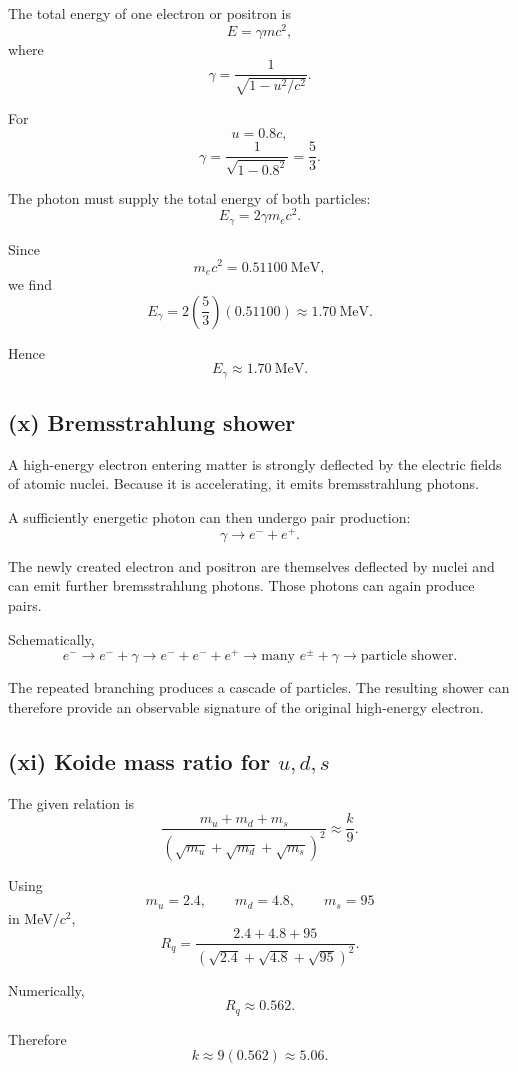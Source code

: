 \documentclass[11pt,a4paper]{article}
\begin{document}
The total energy of one electron or positron is
\[
E=\gamma mc^2,
\]
where
\[
\gamma=
\frac{1}{\sqrt{1-u^2/c^2}}.
\]

For
\[
u=0.8c,
\]
\[
\gamma
=
\frac{1}{\sqrt{1-0.8^2}}
=
\frac53.
\]

The photon must supply the total energy of both particles:
\[
E_\gamma=2\gamma m_ec^2.
\]

Since
\[
m_ec^2=0.51100\ \mathrm{MeV},
\]
we find
\[
E_\gamma
=
2\left(\frac53\right)(0.51100)
\approx1.70\ \mathrm{MeV}.
\]

Hence
\[
\boxed{E_\gamma\approx1.70\ \mathrm{MeV}}.
\]

\subsection{(x) Bremsstrahlung shower}

A high-energy electron entering matter is strongly deflected by the electric fields
of atomic nuclei. Because it is accelerating, it emits bremsstrahlung photons.

A sufficiently energetic photon can then undergo pair production:
\[
\gamma\rightarrow e^-+e^+.
\]

The newly created electron and positron are themselves deflected by nuclei and can
emit further bremsstrahlung photons. Those photons can again produce pairs.

Schematically,
\[
e^-
\longrightarrow
e^-+\gamma
\longrightarrow
e^-+e^-+e^+
\longrightarrow
\text{many }e^\pm+\gamma
\longrightarrow
\text{particle shower}.
\]

The repeated branching produces a cascade of particles. The resulting shower can
therefore provide an observable signature of the original high-energy electron.

\subsection{(xi) Koide mass ratio for $u,d,s$}

The given relation is
\[
\frac{m_u+m_d+m_s}
{\left(\sqrt{m_u}+\sqrt{m_d}+\sqrt{m_s}\right)^2}
\approx\frac{k}{9}.
\]

Using
\[
m_u=2.4,\qquad m_d=4.8,\qquad m_s=95
\]
in MeV$/c^2$,
\[
R_q
=
\frac{2.4+4.8+95}
{\left(\sqrt{2.4}+\sqrt{4.8}+\sqrt{95}\right)^2}.
\]

Numerically,
\[
R_q\approx0.562.
\]

Therefore
\[
k\approx9(0.562)\approx5.06.
\]
\end{document}
